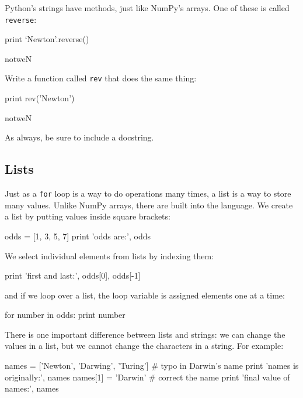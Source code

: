 \begin{challenge}
  Python's strings have methods, just like NumPy's arrays. One of these
  is called \texttt{reverse}:
\begin{VerbIn}
  print `Newton'.reverse()
\end{VerbIn}

\begin{VerbOut}
notweN
\end{VerbOut}
  Write a function called \texttt{rev} that does the same thing:
\begin{VerbIn}
print rev('Newton')
\end{VerbIn}

\begin{VerbOut}
notweN
\end{VerbOut}
  As always, be sure to include a
  docstring.
\end{challenge}

\subsection{Lists}

Just as a \texttt{for} loop is a way to do operations many times, a list
is a way to store many values. Unlike NumPy arrays, there are built into
the language. We create a list by putting values inside square brackets:

\begin{VerbIn}
odds = [1, 3, 5, 7]
print 'odds are:', odds
\end{VerbIn}

We select individual elements from lists by indexing them:

\begin{VerbIn}
print 'first and last:', odds[0], odds[-1]
\end{VerbIn}

and if we loop over a list, the loop variable is assigned elements one
at a time:

\begin{VerbIn}
for number in odds:
    print number
\end{VerbIn}

There is one important difference between lists and strings: we can
change the values in a list, but we cannot change the characters in a
string. For example:

\begin{VerbIn}
names = ['Newton', 'Darwing', 'Turing'] # typo in Darwin's name
print 'names is originally:', names
names[1] = 'Darwin' # correct the name
print 'final value of names:', names
\end{VerbIn}

